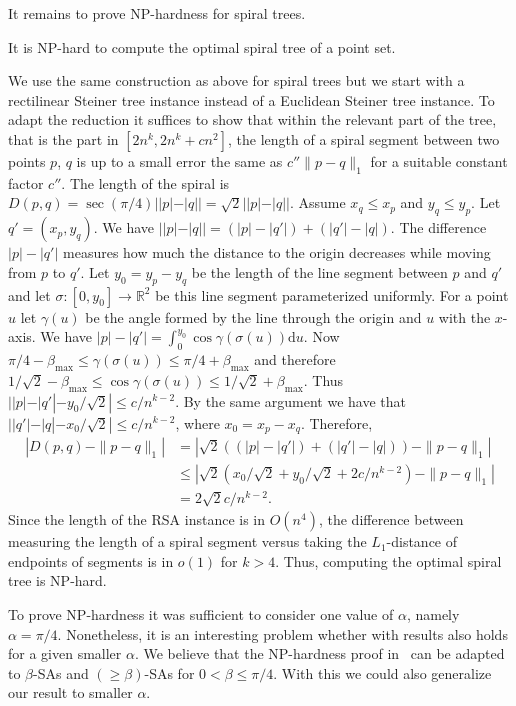\documentclass{journalA4}
\begin{document}
It remains to prove NP-hardness for spiral trees.
\begin{theorem}\label{thm:nphard-spiral}
It is NP-hard to compute the optimal spiral tree of a point set.
\end{theorem}
We use the same construction as above for spiral trees but we start with a rectilinear Steiner tree instance instead of a Euclidean Steiner tree instance. To adapt the reduction it suffices to show that within the relevant part of the tree, that is the part in $[2n^k, 2n^k + c n^2]$, the length of a spiral segment between two points $p$, $q$ is up to a small error the same as $c''\|p-q\|_1$ for a suitable constant factor $c''$. The length of the spiral is $D(p,q) = \sec (\pi/4) ||p|-|q|| = \sqrt{2} ||p|-|q||$. Assume $x_q \leq x_p$ and $y_q \leq y_p$. Let $q' = (x_p, y_q)$. We have $| |p|-|q| | = (|p|-|q'|)+(|q'|-|q|)$. The difference $|p|-|q'|$ measures how much the distance to the origin decreases while moving from $p$ to $q'$. Let $y_0 = y_p-y_q$ be the length of the line segment between $p$ and $q'$ and let $\sigma \colon [0,y_0] \rightarrow \mathbb{R}^2$ be this line segment parameterized uniformly. For a point $u$ let $\gamma (u)$ be the angle formed by the line through the origin and $u$ with the $x$-axis. We have $|p|-|q'|=\int_0^{y_0} \cos \gamma (\sigma (u)) \mathrm{d}u$. Now $\pi/4 - \beta_{\max} \leq \gamma (\sigma (u)) \leq \pi/4 + \beta_{\max}$ and therefore $1/\sqrt{2} - \beta_{\max} \leq \cos \gamma (\sigma (u)) \leq 1/\sqrt{2} + \beta_{\max}$. Thus $||p|-|q'| - y_0/\sqrt{2}| \leq c/n^{k-2}$. By the same argument we have that $||q'|-|q| - x_0/\sqrt{2}| \leq c/n^{k-2}$, where $x_0 = x_p-x_q$. Therefore,
\begin{align*}
|D(p,q) - \|p-q\|_1| &= |\sqrt{2} ((|p|-|q'|)+(|q'|-|q|))- \|p-q\|_1| \\
                     &\leq |\sqrt{2} (x_0/\sqrt{2} + y_0/\sqrt{2} + 2c/n^{k-2}) - \|p-q\|_1|\\
                     &= 2\sqrt{2}c/n^{k-2}.
\end{align*}
Since the length of the RSA instance is in $O(n^4)$, the difference between measuring the length of a spiral segment versus taking the $L_1$-distance of endpoints of segments is in $o(1)$ for $k>4$. Thus, computing the optimal spiral tree is NP-hard.
\hfill\QED
\medskip

To prove NP-hardness it was sufficient to consider one value of $\alpha$, namely $\alpha = \pi/4$. Nonetheless, it is an interesting problem whether with results also holds for a given smaller $\alpha$. We believe that the NP-hardness proof in~\cite{ss-rsap-05} can be adapted to $\beta$-SAs and $(\geq \beta)$-SAs for $0<\beta \leq \pi/4$. With this we could also generalize our result to smaller $\alpha$.
\end{document}
